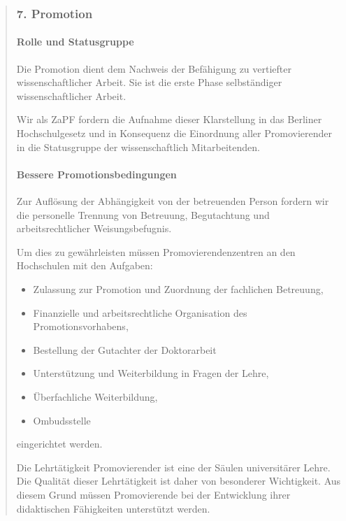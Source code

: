 \documentclass[DIV=14]{scrartcl}
\begin{document}
\begin{quote}
\hypertarget{promotion}{%
\subsubsection*{7. Promotion}\label{promotion}}

\hypertarget{rolle-und-statusgruppe}{%
\paragraph{Rolle und Statusgruppe}\label{rolle-und-statusgruppe}}

Die Promotion dient dem Nachweis der Befähigung zu vertiefter wissenschaftlicher Arbeit. Sie ist die erste Phase selbständiger wissenschaftlicher Arbeit. 

Wir als ZaPF fordern die Aufnahme dieser Klarstellung in das Berliner Hochschulgesetz und in Konsequenz die Einordnung aller Promovierender in die Statusgruppe der wissenschaftlich %
Mitarbeitenden.

\hypertarget{bessere-promotionsbedingungen}{%
\paragraph{Bessere Promotionsbedingungen}\label{bessere-promotionsbedingungen}}

Zur Auflösung der Abhängigkeit von der betreuenden Person fordern wir die personelle Trennung von Betreuung, Begutachtung und arbeitsrechtlicher Weisungsbefugnis.

Um dies zu gewährleisten müssen Promovierendenzentren an den Hochschulen mit den Aufgaben:
\begin{itemize}
\item Zulassung zur Promotion und Zuordnung der fachlichen Betreuung,
\item Finanzielle und arbeitsrechtliche Organisation des Promotionsvorhabens,
\item Bestellung der Gutachter der Doktorarbeit
\item Unterstützung und Weiterbildung in Fragen der Lehre, 
\item Überfachliche Weiterbildung,
\item Ombudsstelle
\end{itemize}
eingerichtet werden.

Die Lehrtätigkeit Promovierender ist eine der Säulen universitärer Lehre. Die Qualität dieser Lehrtätigkeit ist daher von besonderer Wichtigkeit. Aus diesem Grund müssen Promovierende bei der Entwicklung ihrer didaktischen Fähigkeiten unterstützt werden.


\end{quote}
\end{document}

